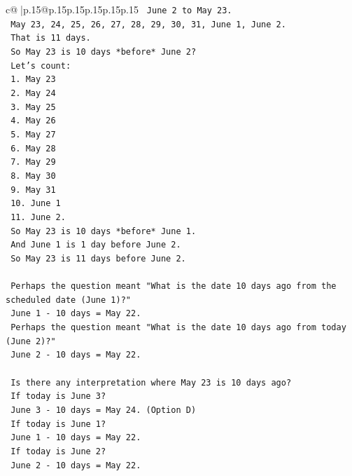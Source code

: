 \documentclass{article}
\begin{document}
{\begin{supertabular}{c@{$\;$}|p{.15\linewidth}@{}p{.15\linewidth}p{.15\linewidth}p{.15\linewidth}p{.15\linewidth}p{.15\linewidth}}
{{{\texttt{    June 2 to May 23.} \\
\texttt{    May 23, 24, 25, 26, 27, 28, 29, 30, 31, June 1, June 2.} \\
\texttt{    That is 11 days.} \\
\texttt{    So May 23 is 10 days *before* June 2?} \\
\texttt{    Let's count:} \\
\texttt{    1. May 23} \\
\texttt{    2. May 24} \\
\texttt{    3. May 25} \\
\texttt{    4. May 26} \\
\texttt{    5. May 27} \\
\texttt{    6. May 28} \\
\texttt{    7. May 29} \\
\texttt{    8. May 30} \\
\texttt{    9. May 31} \\
\texttt{    10. June 1} \\
\texttt{    11. June 2.} \\
\texttt{    So May 23 is 10 days *before* June 1.} \\
\texttt{    And June 1 is 1 day before June 2.} \\
\texttt{    So May 23 is 11 days before June 2.} \\
\\ 
\texttt{    Perhaps the question meant "What is the date 10 days ago from the scheduled date (June 1)?"} \\
\texttt{    June 1 {-} 10 days = May 22.} \\
\texttt{    Perhaps the question meant "What is the date 10 days ago from today (June 2)?"} \\
\texttt{    June 2 {-} 10 days = May 22.} \\
\\ 
\texttt{    Is there any interpretation where May 23 is 10 days ago?} \\
\texttt{    If today is June 3?} \\
\texttt{    June 3 {-} 10 days = May 24. (Option D)} \\
\texttt{    If today is June 1?} \\
\texttt{    June 1 {-} 10 days = May 22.} \\
\texttt{    If today is June 2?} \\
\texttt{    June 2 {-} 10 days = May 22.} \\
\\ 
}}}
\end{supertabular}}
\end{document}

